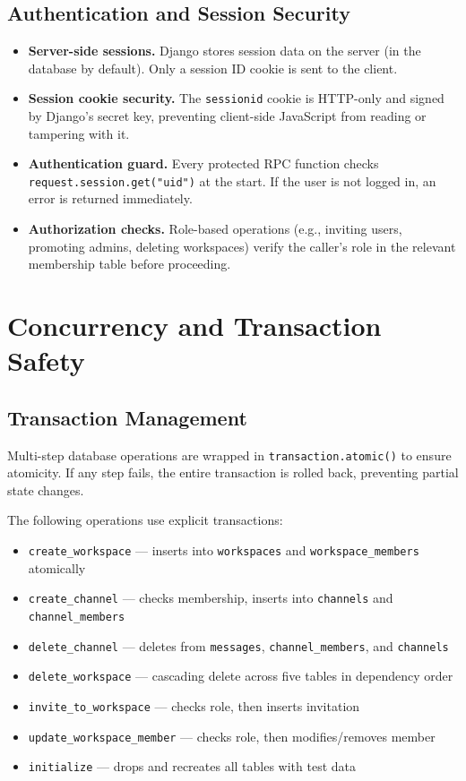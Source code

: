 \documentclass[11pt]{article}
\begin{document}
\subsection{Authentication and Session Security}

\begin{itemize}
    \item \textbf{Server-side sessions.} Django stores session data on the server (in the database by default). Only a session ID cookie is sent to the client.
    \item \textbf{Session cookie security.} The \texttt{sessionid} cookie is HTTP-only and signed by Django's secret key, preventing client-side JavaScript from reading or tampering with it.
    \item \textbf{Authentication guard.} Every protected RPC function checks \texttt{request.session.get("uid")} at the start. If the user is not logged in, an error is returned immediately.
    \item \textbf{Authorization checks.} Role-based operations (e.g., inviting users, promoting admins, deleting workspaces) verify the caller's role in the relevant membership table before proceeding.
\end{itemize}


\newpage
\section{Concurrency and Transaction Safety}
\label{sec:concurrency}

\subsection{Transaction Management}

Multi-step database operations are wrapped in \texttt{transaction.atomic()} to ensure atomicity. If any step fails, the entire transaction is rolled back, preventing partial state changes.

The following operations use explicit transactions:

\begin{itemize}
    \item \texttt{create\_workspace} --- inserts into \texttt{workspaces} and \texttt{workspace\_members} atomically
    \item \texttt{create\_channel} --- checks membership, inserts into \texttt{channels} and \texttt{channel\_members}
    \item \texttt{delete\_channel} --- deletes from \texttt{messages}, \texttt{channel\_members}, and \texttt{channels}
    \item \texttt{delete\_workspace} --- cascading delete across five tables in dependency order
    \item \texttt{invite\_to\_workspace} --- checks role, then inserts invitation
    \item \texttt{update\_workspace\_member} --- checks role, then modifies/removes member
    \item \texttt{initialize} --- drops and recreates all tables with test data
\end{itemize}
\end{document}
